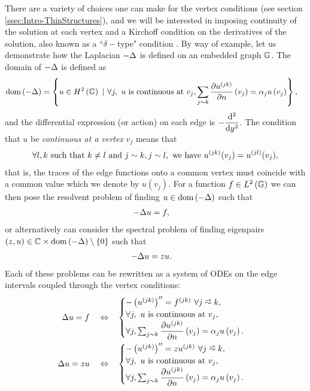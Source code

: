 There are a variety of choices one can make for the vertex conditions (see section \ref{ssec:Intro-ThinStructures}), and we will be interested in imposing continuity of the solution at each vertex and a Kirchoff condition on the derivatives of the solution, also known as a ``$\delta-$type" condition \cite{berkolaiko2013introduction, ershova2014isospectrality, ershova2016isospectrality}.
By way of example, let us demonstrate how the Laplacian $-\Delta$ is defined on an embedded graph $\mathbb{G}$.
The domain of $-\Delta$ is defined as
\begin{align} \label{eq:GraphLaplacianExample}
	\mathrm{dom}\left( -\Delta \right) &= \left\{  u\in H^2\left( \mathbb{G} \right) \ \vert \ \forall j, \ u \text{ is continuous at } v_j, \sum_{j\sim k}\dfrac{\partial u^{(jk)}}{\partial n}\left( v_j \right) = \alpha_j u\left( v_j \right)  \right\},
\end{align}
and the differential expression (or action) on each edge is $-\dfrac{\mathrm{d}^2 }{\mathrm{d} {y}^2}$.
The condition that $u$ be \emph{continuous at a vertex} $v_j$ means that
\begin{align*}
	\forall l,k \text{ such that } k\neq l \text{ and } j\sim k, j\sim l, \text{ we have } u^{(jk)}(v_j) = u^{(jl)}(v_j),
\end{align*}
that is, the traces of the edge functions onto a common vertex must coincide with a common value which we denote by $u(v_j)$.
For a function $f\in L^2\left( \mathbb{G} \right)$ we can then pose the resolvent problem of finding $u\in\mathrm{dom}\left( -\Delta \right)$ such that
\begin{align*}
	-\Delta u &= f,
\end{align*}
or alternatively can consider the spectral problem of finding eigenpairs $\left( z,u \right)\in\mathbb{C}\times\mathrm{dom}\left( -\Delta \right)\setminus\left\{ 0 \right\}$ such that
\begin{align*}
	-\Delta u &= z u.
\end{align*}
Each of these problems can be rewritten as a system of ODEs on the edge intervals coupled through the vertex conditions:
\begin{subequations} \label{eq:GraphLaplacianIFFs}
	\begin{align}
		\laplacian u = f \quad\Leftrightarrow\quad &
		\begin{cases}
			-\bracs{u^{(jk)}}'' = f^{(jk)} \ \forall j\conLeft k, \\
			\forall j, \ u \text{ is continuous at } v_j, \\
			\forall j, \sum_{j\con k}\pdiff{u^{(jk)}}{n}\bracs{v_j} = \alpha_j u\bracs{v_j}.
		\end{cases} \\
		\laplacian u = z u \quad\Leftrightarrow\quad &
		\begin{cases}
			-\bracs{u^{(jk)}}'' = z u^{(jk)} \ \forall j\conLeft k, \\
			\forall j, \ u \text{ is continuous at } v_j, \\
			\forall j, \sum_{j\con k}\pdiff{u^{(jk)}}{n}\bracs{v_j} = \alpha_j u\bracs{v_j}.
		\end{cases} \label{eq:GraphLaplacianIFFs-Spectral}
	\end{align}
\end{subequations}
